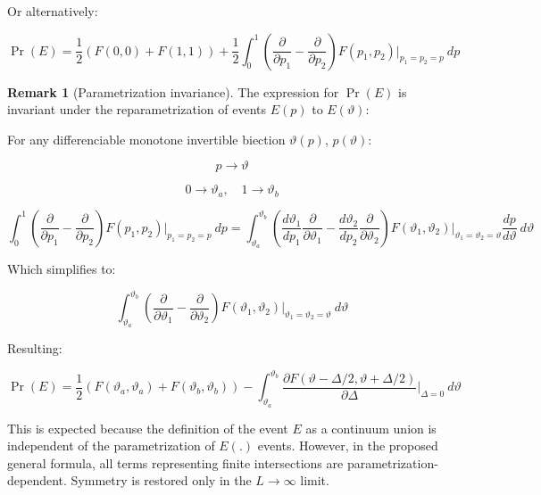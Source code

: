 \documentclass{article}
\theoremstyle{definition}
\newtheorem*{remark}{Remark}
\begin{document}
Or alternatively:

\begin{equation}
    \Pr(E) 
    = 
    \frac{1}{2} \left ( F(0,0)+F(1,1) \right ) 
    +
    \frac{1}{2}
    \int_0^1
    \left(
    \frac{\partial}{\partial p_1}-
    \frac{\partial}{\partial p_2}
    \right)
    F(p_1, p_2) 
    \Bigg |_{p_1=p_2=p}
    \ d p
\end{equation}

\begin{remark}[Parametrization invariance]
The expression for $\Pr(E)$ is invariant under the reparametrization of events $E(p)$ to $E(\vartheta)$:

For any differenciable monotone invertible biection $\vartheta(p)$, $p(\vartheta)$:

\begin{equation}
    p \to \vartheta
\end{equation}

\begin{equation}
    0 \to \vartheta_a, \quad
    1 \to \vartheta_b
\end{equation}


\begin{equation}
    \int_0^1
    \left(
    \frac{\partial}{\partial p_1}-
    \frac{\partial}{\partial p_2}
    \right)
    F(p_1, p_2) 
    \Bigg |_{p_1=p_2=p}
    \ d p
    =
    \int_{\vartheta_a}^{\vartheta_b}
    \left(
    \frac{d \vartheta_1}{d p_1} \frac{\partial}{\partial \vartheta_1}-
    \frac{d \vartheta_2}{d p_2} \frac{\partial}{\partial \vartheta_2}
    \right)
    F(\vartheta_1, \vartheta_2) 
    \Bigg |_{\vartheta_1=\vartheta_2=\vartheta}
    \frac{d p}{d \vartheta}\ d \vartheta
\end{equation}

Which simplifies to:

\begin{equation}
    \int_{\vartheta_a}^{\vartheta_b}
    \left(
    \frac{\partial}{\partial \vartheta_1}-
    \frac{\partial}{\partial \vartheta_2}
    \right)
    F(\vartheta_1, \vartheta_2) 
    \Bigg |_{\vartheta_1=\vartheta_2=\vartheta}
    \ d \vartheta
\end{equation}

Resulting:

\begin{equation}
    \Pr(E) 
    = 
    \frac{1}{2} \left ( F(\vartheta_a,\vartheta_a)+F(\vartheta_b,\vartheta_b) \right ) 
    - \int_{\vartheta_a}^{\vartheta_b}
    \frac{\partial
    F(\vartheta - \Delta/2, \vartheta + \Delta/2) 
    }{\partial \Delta}
    \Bigg |_{\Delta=0}
    \ d \vartheta
\end{equation}

This is expected because the definition of the event $E$ as a continuum union is independent of the parametrization of $E(.)$ events.
However, in the proposed general formula, all terms representing finite intersections are parametrization-dependent. Symmetry is restored only in the $ L \to \infty$ limit.

\end{remark}
\end{document}
